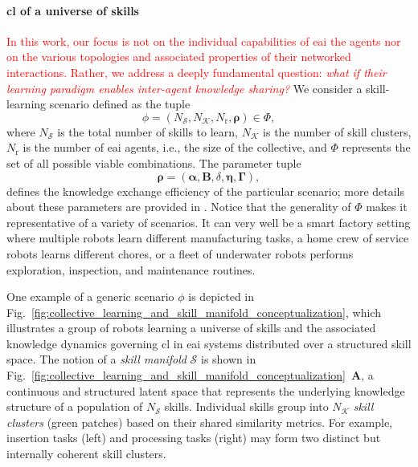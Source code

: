 \documentclass[12pt]{article}
\newcommand\myhl[1]{\textcolor{red}{#1}}
\renewcommand{\emph}[1]{\textit{#1}}
\begin{document}
\paragraph*{\Acl{cl} of a universe of skills}
\myhl{In this work, our focus is not on the individual capabilities of \ac{eai} the agents nor on the various topologies and associated properties of their networked interactions. Rather, we address a deeply fundamental question: \emph{what if their learning paradigm enables inter-agent knowledge sharing?}} We consider a skill-learning scenario defined as the tuple
\begin{equation*}
	\phi = \left(N_\mathcal{S}, N_\mathcal{K}, N_\mathrm{r}, \bm{\rho} \right) \in \Phi,
\end{equation*}
where $N_\mathcal{S}$ is the total number of skills to learn, $N_\mathcal{K}$ is the number of skill clusters, $N_\mathrm{r}$ is the number of \ac{eai} agents, i.e., the size of the collective, and $\Phi$ represents the set of all possible viable combinations. The parameter tuple
\begin{equation*}
	\bm{\rho} = \left(\bm{\alpha}, \bm{B}, \delta, \bm{\eta},\bm{\Gamma}\right),
\end{equation*}
defines the knowledge exchange efficiency of the particular scenario; more details about these parameters are provided in . Notice that the generality of $\Phi$ makes it representative of a variety of scenarios. It can very well be a smart factory setting where multiple robots learn different manufacturing tasks, a home crew of service robots learns different chores, or a fleet of underwater robots performs exploration, inspection, and maintenance routines.

One example of a generic scenario $\phi$ is depicted in Fig.~\ref{fig:collective_learning_and_skill_manifold_conceptualization}, which illustrates a group of robots learning a universe of skills and the associated knowledge dynamics governing \ac{cl} in \ac{eai} systems distributed over a structured skill space. The notion of a \textit{skill manifold} $\mathcal{S}$ is shown in Fig.~\ref{fig:collective_learning_and_skill_manifold_conceptualization}~\textbf{A}, a continuous and structured latent space that represents the underlying knowledge structure of a population of $N_\mathcal{S}$ skills. Individual skills group into $N_\mathcal{K}$ \emph{skill clusters} (green patches) based on their shared similarity metrics. For example, insertion tasks (left) and processing tasks (right) may form two distinct but internally coherent skill clusters.
\end{document}
